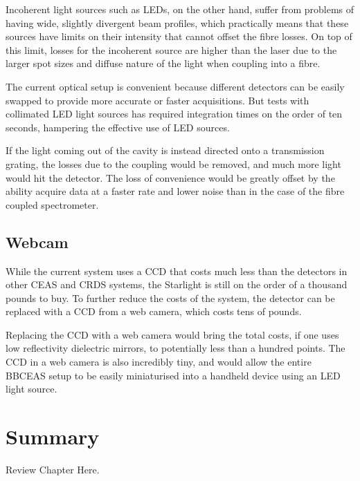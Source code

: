 Incoherent light sources such as \acp{LED}, on the other hand, suffer from
problems of having wide, slightly divergent beam profiles, which practically
means that these sources have limits on their intensity that cannot offset the
fibre losses. On top of this limit, losses for the incoherent source are
higher than the laser due to the larger spot sizes and diffuse nature of the
light when coupling into a fibre.

The current optical setup is convenient because different detectors can be
easily swapped to provide more accurate or faster acquisitions. But tests with
collimated \ac{LED} light sources has required integration
times on the order of ten seconds, hampering the effective use of \ac{LED}
sources.

If the light coming out of the cavity is instead directed onto a transmission
grating, the losses due to the coupling would be removed, and much more light
would hit the detector. The loss of convenience would be greatly offset by the
ability acquire data at a faster rate and lower noise than in the case of the
fibre coupled spectrometer.

\subsection{Webcam}

While the current system uses a \ac{CCD} that costs much less than the
detectors in other \ac{CEAS} and \ac{CRDS} systems, the Starlight is still on
the order of a thousand pounds to buy. To further reduce the costs of the
system, the detector can be replaced with a \ac{CCD} from a web camera, which
costs tens of pounds.

Replacing the \ac{CCD} with a web camera would bring the total costs, if one
uses low reflectivity dielectric mirrors, to potentially less than a hundred
points. The \ac{CCD} in a web camera is also incredibly tiny, and would allow
the entire \ac{BBCEAS} setup to be easily miniaturised into a handheld device
using an \ac{LED} light source.

\section{Summary}
Review Chapter Here.
